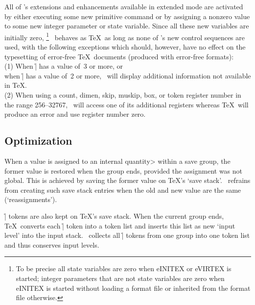 \documentclass[11pt]{article}
\begin{document}
All of \eTeX's extensions and enhancements available in extended mode are
activated by either executing some new primitive command or by assigning
a nonzero value to some new integer parameter or state variable. Since
all these new variables are initially zero,%
\footnote{To be precise all state variables are zero when eINITEX or eVIRTEX
is started; integer parameters that are not state variables are zero when
eINITEX is started without loading a format file or inherited from the
format file otherwise.}
\eTeX\ behaves as \TeX\ as long as none of \eTeX's new control sequences
are used, with the following exceptions which should, however, have
no effect on the typesetting of error-free \TeX\ documents (produced with
error-free formats):\\
(1) When \|\tracingcommands| has a value of~3 or more, or\\
when \|\tracinglostchars| has a value of~2 or more, \eTeX\ will display
additional information not available in \TeX.\\
(2) When using a count, dimen, skip, muskip, box, or token register number
in the range 256--32767, \eTeX\ will access one of its additional registers
whereas \TeX\ will produce an error and use register number zero.

\subsection{Optimization}

When a value is assigned to an \<internal quantity> within a save group,
the former value is restored when the group ends, provided the
assignment was not global. This is achieved by saving the former value
on \TeX's `save stack'. \eTeX\ refrains from creating such save stack
entries when the old and new value are the same (`reassignments').

\|\aftergroup| tokens are also kept on \TeX's save stack.  When the
current group ends, \TeX\ converts each \|\aftergroup| token into a
token list and inserts this list as new `input level' into the input stack.
\eTeX\ collects all \|\aftergroup| tokens from one group into one token
list and thus conserves input levels.
\end{document}
